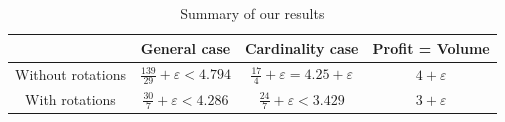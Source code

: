 \documentclass[10pt,a4paper]{amsart}
\renewcommand{\epsilon}{\varepsilon} %
\theoremstyle{definition}
\begin{document}
\begin{table}
\centering{}%
\bgroup
\def\arraystretch{3}
\begin{tabular}{|c|c|c|c|}
\hline 
  & \textbf{General case} & \textbf{Cardinality case}  & \textbf{Profit = Volume} \tabularnewline
\hline 
Without rotations & $\displaystyle\frac{139}{29}+\epsilon < 4.794$ & $\displaystyle\frac{17}{4}+\epsilon = 4.25 + \epsilon$ & $4+\epsilon$  
\tabularnewline\hline
With rotations & $\displaystyle\frac{30}{7}+\epsilon < 4.286$  & $\displaystyle\frac{24}{7}+\epsilon < 3.429$  & $3+\epsilon$ 
\tabularnewline
\hline
\end{tabular}
\egroup
\caption{Summary of our results}
\label{tab:summary}
\end{table}



\end{document}
